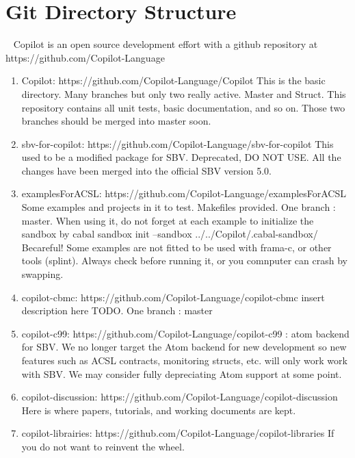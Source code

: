 \section{Git Directory Structure}~\label{sec:Git}
Copilot is an open source development effort with a github repository at
https://github.com/Copilot-Language

\begin{enumerate}
\item Copilot: https://github.com/Copilot-Language/Copilot   This is the basic directory. Many branches but only two really active. Master and Struct. This repository contains all unit tests, basic documentation, and so on. Those two branches should be merged into master soon.
\item sbv-for-copilot: https://github.com/Copilot-Language/sbv-for-copilot This used to be a modified package for SBV. Deprecated, DO NOT USE. All the changes have been merged into the official SBV version 5.0.
\item examplesForACSL: https://github.com/Copilot-Language/examplesForACSL  Some examples and projects in it to test. Makefiles provided. One branch : master. When using it, do not forget at each example to initialize the sandbox by cabal sandbox init --sandbox ../../Copilot/.cabal-sandbox/ 
\subitem Becareful! Some examples are not fitted to be used with frama-c, or other tools (splint). Always check before running it, or you comnputer can crash by swapping.
\item copilot-cbmc: https://github.com/Copilot-Language/copilot-cbmc  insert description here TODO. One branch : master
\item copilot-c99: https://github.com/Copilot-Language/copilot-c99 : atom backend for SBV.  We no longer target the Atom backend for new development so new features such as ACSL contracts, monitoring structs, etc. will only work work with SBV. We may consider fully depreciating Atom support at some point. 
\item copilot-discussion: https://github.com/Copilot-Language/copilot-discussion Here is where papers, tutorials, and working documents are kept. 
\item copilot-librairies: https://github.com/Copilot-Language/copilot-libraries  If you do not want to reinvent the wheel. 

\end{enumerate}


